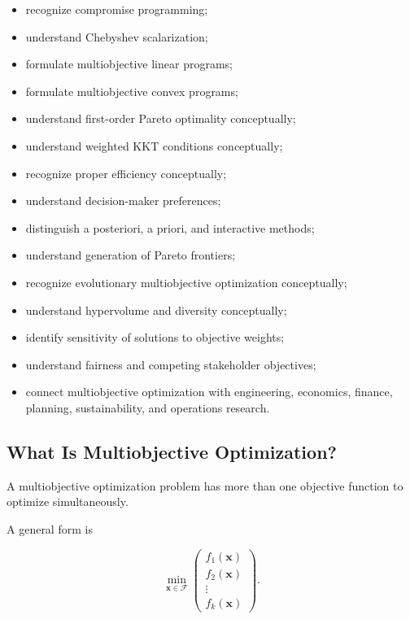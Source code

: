 {\begin{itemize}
    \item recognize compromise programming;
    \item understand Chebyshev scalarization;
    \item formulate multiobjective linear programs;
    \item formulate multiobjective convex programs;
    \item understand first-order Pareto optimality conceptually;
    \item understand weighted KKT conditions conceptually;
    \item recognize proper efficiency conceptually;
    \item understand decision-maker preferences;
    \item distinguish a posteriori, a priori, and interactive methods;
    \item understand generation of Pareto frontiers;
    \item recognize evolutionary multiobjective optimization conceptually;
    \item understand hypervolume and diversity conceptually;
    \item identify sensitivity of solutions to objective weights;
    \item understand fairness and competing stakeholder objectives;
    \item connect multiobjective optimization with engineering,
          economics, finance, planning, sustainability, and operations
          research.
\end{itemize}
}

\subsection{What Is Multiobjective Optimization?}
\label{subsec:what-is-multiobjective-optimization}

A multiobjective optimization problem has more than one objective function
to optimize simultaneously.

A general form is

\[
\boxed{
\min_{\mathbf{x}\in\mathcal{F}}
\begin{pmatrix}
f_1(\mathbf{x})\\
f_2(\mathbf{x})\\
\vdots\\
f_k(\mathbf{x})
\end{pmatrix}.
}
\]

